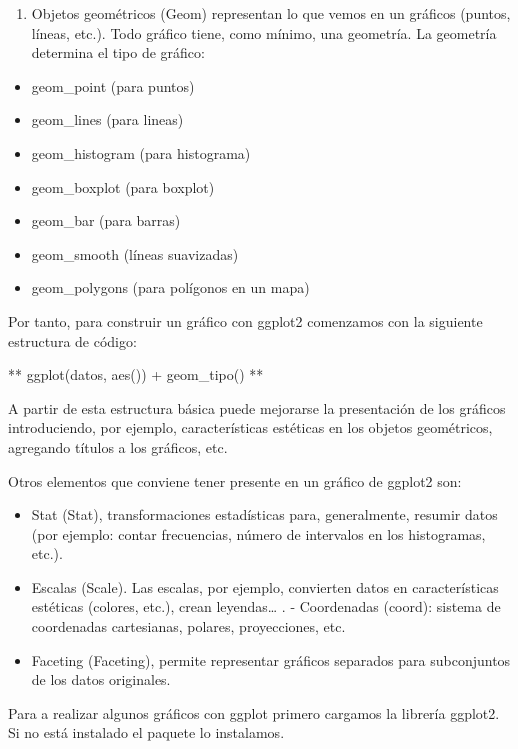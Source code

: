 \documentclass[
  12pt,
]{book}
\providecommand{\tightlist}{%
  \setlength{\itemsep}{0pt}\setlength{\parskip}{0pt}}
\begin{document}
\begin{enumerate}
\def\labelenumi{\arabic{enumi}.}
\setcounter{enumi}{2}
\tightlist
\item
  Objetos geométricos (Geom) representan lo que vemos en un gráficos (puntos, líneas, etc.). Todo gráfico tiene, como mínimo, una geometría. La geometría determina el tipo de gráfico:
\end{enumerate}

\begin{itemize}
\tightlist
\item
  geom\_point (para puntos)
\item
  geom\_lines (para lineas)
\item
  geom\_histogram (para histograma)
\item
  geom\_boxplot (para boxplot)
\item
  geom\_bar (para barras)
\item
  geom\_smooth (líneas suavizadas)
\item
  geom\_polygons (para polígonos en un mapa)
\end{itemize}

Por tanto, para construir un gráfico con ggplot2 comenzamos con la siguiente estructura de código:

** ggplot(datos, aes()) + geom\_tipo() **

A partir de esta estructura básica puede mejorarse la presentación de los gráficos introduciendo, por ejemplo, características estéticas en los objetos geométricos, agregando títulos a los gráficos, etc.

Otros elementos que conviene tener presente en un gráfico de ggplot2 son:

\begin{itemize}
\item
  Stat (Stat), transformaciones estadísticas para, generalmente, resumir datos (por ejemplo: contar frecuencias, número de intervalos en los histogramas, etc.).
\item
  Escalas (Scale). Las escalas, por ejemplo, convierten datos en características estéticas (colores, etc.), crean leyendas\ldots{} . - Coordenadas (coord): sistema de coordenadas cartesianas, polares, proyecciones, etc.
\item
  Faceting (Faceting), permite representar gráficos separados para subconjuntos de los datos originales.
\end{itemize}

Para a realizar algunos gráficos con ggplot primero cargamos la librería ggplot2. Si no está instalado el paquete lo instalamos.
\end{document}
